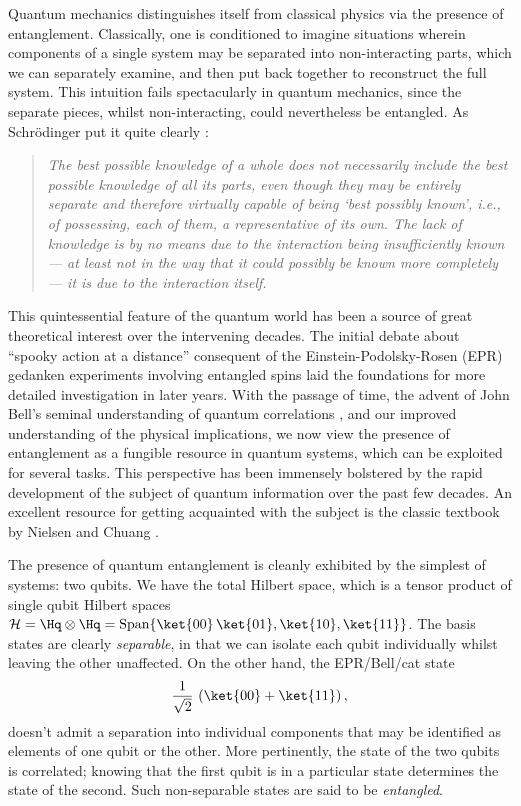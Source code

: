 \documentclass[12pt,openany]{book}
\begin{document}
Quantum mechanics distinguishes itself from classical physics via the presence of entanglement. Classically, one is conditioned to imagine situations wherein components of a single system  may be separated into non-interacting parts, which we can separately examine, and then put back together to reconstruct the full system. This intuition fails  spectacularly in quantum mechanics, since the separate pieces, whilst non-interacting, could nevertheless be entangled. As Schr\"odinger put it quite clearly \cite{Schrodinger:1935zz}:
\begin{quote}
{\em The best possible knowledge of a whole does not necessarily include the best possible knowledge of all its parts, even though they may be entirely separate and therefore virtually capable of being `best possibly known', i.e., of possessing, each of them, a representative of its own. The lack of knowledge is by no means due to the interaction being insufficiently known — at least not in the way that it could possibly be known more completely — it is due to the interaction itself.}
\end{quote}

This quintessential feature of the quantum world has been a source of great theoretical interest over the intervening decades. The initial debate about ``spooky action at a distance'' consequent of the Einstein-Podolsky-Rosen (EPR) \cite{Einstein:1935rr} gedanken experiments involving  entangled spins laid the foundations for more detailed investigation in later years. With the passage of time, the advent of John Bell's seminal understanding of quantum correlations \cite{Bell:1966aa},  and our improved understanding of the physical implications, we now view the presence of entanglement as a fungible resource in quantum systems, which can be exploited for several tasks. This perspective has been immensely bolstered by the rapid development of the subject of quantum information over the past few decades. An excellent resource for getting acquainted with the subject is the classic textbook  by Nielsen and Chuang \cite{Nielsen:2010aa}.

The presence of quantum entanglement is cleanly exhibited by the simplest of systems: two qubits. We have the total Hilbert space, which is a tensor product of single qubit Hilbert spaces ${\cal H} = \Hq \otimes \Hq = \text{Span}\{ \ket{00}\, \ket{01}, \ket{10}, \ket{11}\}$. The basis states are clearly {\em separable}, in that we can isolate each qubit individually whilst leaving the other unaffected. On the other hand, the  EPR/Bell/cat state
%
\begin{equation}
\frac{1}{\sqrt{2}}\, \left(\ket{00} + \ket{11} \right) ,
\label{}
\end{equation}
%
doesn't admit a separation into individual components that may be identified as elements of one qubit or the other. More pertinently, the state of the two qubits is correlated; knowing that the first qubit is in a particular state determines the state of the second. Such non-separable states are said to be {\em entangled}.
\end{document}
